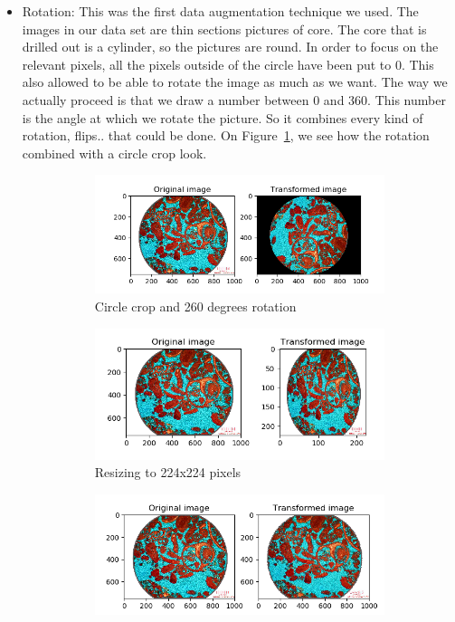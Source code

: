 \begin{itemize}
    \item Rotation: This was the first data augmentation technique we used. The images in our data set are thin sections pictures of core. The core that is drilled out is a cylinder, so the pictures are round. In order to focus on the relevant pixels, all the pixels outside of the circle have been put to 0. This also allowed to be able to rotate the image as much as we want. The way we actually proceed is that we draw a number between 0 and 360. This number is the angle at which we rotate the picture. So it combines every kind of rotation, flips.. that could be done. On Figure~\ref{fig:rotate}, we see how the rotation combined with a circle crop look.
\begin{figure}
\begin{subfigure}{.5\textwidth}
  \centering
  \includegraphics[width=1\linewidth]{figures/03-rotation_260}
  \caption{Circle crop and 260 degrees rotation}
  \label{fig:rotate}
\end{subfigure}%
\begin{subfigure}{.5\textwidth}
  \centering
  \includegraphics[width=1\linewidth]{figures/03-resize.PNG}
  \caption{Resizing to 224x224 pixels}
  \label{fig:resize}
\end{subfigure}
\begin{subfigure}{.5\textwidth}
  \centering
  \includegraphics[width=1\linewidth]{figures/03-elastic_trans_08_03.PNG}

\end{subfigure}
\end{figure}
\end{itemize}

